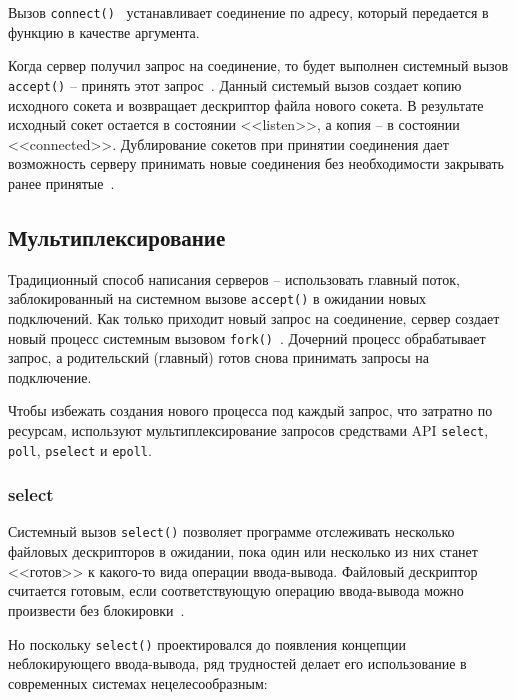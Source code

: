Вызов \texttt{connect()}~\cite{man-connect} устанавливает соединение по адресу, который передается в функцию в качестве аргумента.

Когда сервер получил запрос на соединение, то будет выполнен системный вызов \texttt{accept()} -- принять этот запрос~\cite{man-accept}. Данный системый вызов создает копию исходного сокета и возвращает дескриптор файла нового сокета. В результате исходный сокет остается в состоянии <<listen>>, а копия -- в состоянии <<connected>>. Дублирование сокетов при принятии соединения дает возможность серверу принимать новые соединения без необходимости закрывать ранее принятые~\cite{stevens}.

\subsection{Мультиплексирование}

Традиционный способ написания серверов -- использовать главный поток, заблокированный на системном вызове \texttt{accept()} в ожидании новых подключений. Как только приходит новый запрос на соединение, сервер создает новый процесс системным вызовом \texttt{fork()}~\cite{man-fork}. Дочерний процесс обрабатывает запрос, а родительский (главный) готов снова принимать запросы на подключение.

Чтобы избежать создания нового процесса под каждый запрос, что затратно по ресурсам, используют мультиплексирование запросов средствами API \texttt{select}, \texttt{poll}, \texttt{pselect} и \texttt{epoll}.

\subsubsection{select}

Системный вызов \texttt{select()} позволяет программе отслеживать несколько файловых дескрипторов в ожидании, пока один или несколько из них станет <<готов>> к какого-то вида операции ввода-вывода. Файловый дескриптор считается готовым, если соответствующую операцию ввода-вывода можно произвести без блокировки~\cite{man-select}.

Но поскольку \texttt{select()} проектировался до появления концепции неблокирующего ввода-вывода, ряд трудностей делает его использование в современных системах нецелесообразным:

